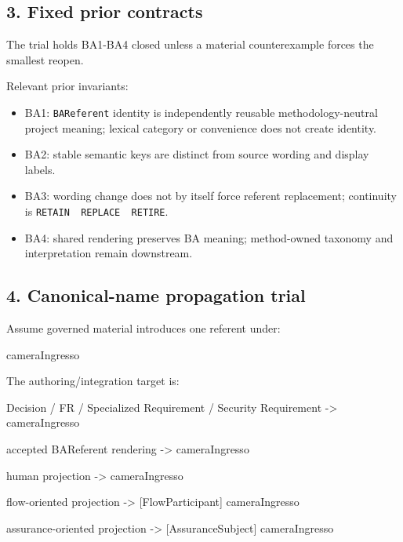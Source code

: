 \documentclass[
  10pt,
  a4paper,
]{article}
\newenvironment{Shaded}{}{}
\newcommand{\NormalTok}[1]{#1}
\providecommand{\tightlist}{%
  \setlength{\itemsep}{0pt}\setlength{\parskip}{0pt}}
\begin{document}
\subsection{3. Fixed prior contracts}\label{fixed-prior-contracts}

The trial holds BA1-BA4 closed unless a material counterexample forces
the smallest reopen.

Relevant prior invariants:

\begin{itemize}
\tightlist
\item
  BA1: \texttt{BAReferent} identity is independently reusable
  methodology-neutral project meaning; lexical category or convenience
  does not create identity.
\item
  BA2: stable semantic keys are distinct from source wording and display
  labels.
\item
  BA3: wording change does not by itself force referent replacement;
  continuity is
  \texttt{RETAIN\ \textbar{}\ REPLACE\ \textbar{}\ RETIRE}.
\item
  BA4: shared rendering preserves BA meaning; method-owned taxonomy and
  interpretation remain downstream.
\end{itemize}

\subsection{4. Canonical-name propagation
trial}\label{canonical-name-propagation-trial}

Assume governed material introduces one referent under:

\begin{Shaded}
\begin{Highlighting}[]
\NormalTok{cameraIngresso}
\end{Highlighting}
\end{Shaded}

The authoring/integration target is:

\begin{Shaded}
\begin{Highlighting}[]
\NormalTok{Decision / FR / Specialized Requirement / Security Requirement}
\NormalTok{    {-}\textgreater{} cameraIngresso}

\NormalTok{accepted BAReferent rendering}
\NormalTok{    {-}\textgreater{} cameraIngresso}

\NormalTok{human projection}
\NormalTok{    {-}\textgreater{} cameraIngresso}

\NormalTok{flow{-}oriented projection}
\NormalTok{    {-}\textgreater{} [FlowParticipant] cameraIngresso}

\NormalTok{assurance{-}oriented projection}
\NormalTok{    {-}\textgreater{} [AssuranceSubject] cameraIngresso}
\end{Highlighting}
\end{Shaded}
\end{document}
